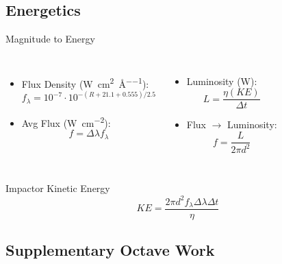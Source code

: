 \documentclass[pdf]{beamer}
\begin{document}
 \subsection{Energetics}

 \begin{frame}{Magnitude to Energy}
   \begin{columns}
	 \begin{itemize}
	   \item Flux Density (\si{\watt\per\centi\meter^2\per\angstrom}):
		 \[f_{\lambda} = 10^{-7}\cdot 10^{-(R+21.1+0.555)/2.5}\]
	   \item Avg Flux (\si{\watt\per\centi\meter^2}):
		 \[f = \Delta \lambda f_\lambda\]
	 \end{itemize}
	 \begin{itemize}
	   \item Luminosity (\si{\watt}):
		 \[L = \frac{\eta (KE)}{\Delta t}\]
	   \item Flux $\rightarrow$ Luminosity:
		 \[f = \frac{L}{2\pi d^2}\]
	 \end{itemize}
   \end{columns}
   \begin{block}{Impactor Kinetic Energy}
	 \[KE = \frac{2\pi d^2 f_\lambda \Delta \lambda \Delta t}{\eta}\]
   \end{block}
 \end{frame}

 \subsection{Supplementary Octave Work}
\end{document}
